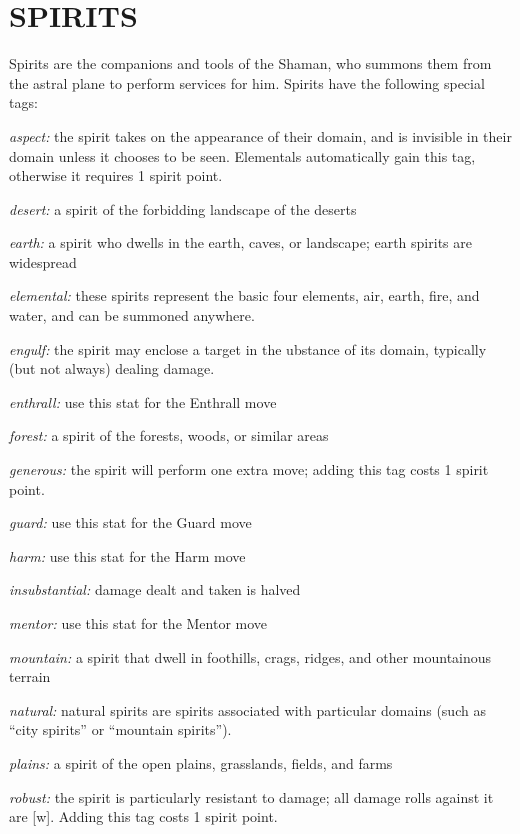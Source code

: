 \documentclass[oneside,10pt]{article}
\begin{document}
\section{SPIRITS}
\begin{multicols}{2}
Spirits are the companions and tools of the Shaman, who
summons them from the astral plane to perform services for
him. Spirits have the following special tags:

\begin{dent}
\textit{aspect:} the spirit takes on the appearance of their domain,
and is invisible in their domain unless it chooses to be
seen. Elementals automatically gain this tag, otherwise it
requires 1 spirit point.

\textit{desert:} a spirit of the forbidding landscape of
the deserts

\textit{earth:} a spirit who dwells in the earth, caves, or landscape;
earth spirits are widespread

\textit{elemental:} these spirits represent the basic four elements,
air, earth, fire, and water, and can be summoned
anywhere.

\textit{engulf:} the spirit may enclose a target in the ubstance of its
domain, typically (but not always) dealing damage.

\textit{enthrall:} use this stat for the Enthrall move

\textit{forest:} a spirit of the forests, woods, or similar
areas

\textit{generous:} the spirit will perform one extra move; adding
this tag costs 1 spirit point.

\textit{guard:} use this stat for the Guard move

\textit{harm:} use this stat for the Harm move

\textit{insubstantial:} damage dealt and taken is halved

\textit{mentor:} use this stat for the Mentor move

\textit{mountain:} a spirit that dwell in foothills, crags, ridges, and
other mountainous terrain

\textit{natural:} natural spirits are spirits associated
with particular domains (such as ``city spirits'' or
``mountain spirits'').

\textit{plains:} a spirit of the open plains, grasslands, fields, and
farms

\textit{robust:} the spirit is particularly resistant to damage; all
damage rolls against it are [w]. Adding this tag costs 1
spirit point.


\end{dent}
\end{multicols}
\end{document}
